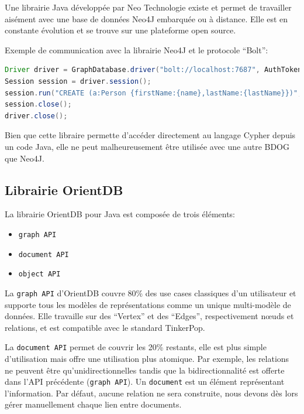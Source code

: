 \documentclass[a4paper,fleqn,12pt,oneside]{report}
\begin{document}
Une librairie Java développée par Neo Technologie existe et permet de travailler aisément avec une base de données Neo4J embarquée ou à distance. Elle est en constante évolution et se trouve sur une plateforme open source. 

Exemple de communication avec la librairie Neo4J et le protocole \enquote{Bolt}:
\vspace{0.6cm}
\begin{lstlisting}[language=java]
Driver driver = GraphDatabase.driver("bolt://localhost:7687", AuthTokens.basic("matrix", "neo"));
Session session = driver.session();
session.run("CREATE (a:Person {firstName:{name},lastName:{lastName}})", parameters("firstName","Gilles","lastName","Bodart"));
session.close();
driver.close();

\end{lstlisting}

Bien que cette libraire permette d'accéder directement au langage Cypher depuis un code Java, elle ne peut malheureusement être utilisée avec une autre BDOG que Neo4J. 

\subsection{Librairie OrientDB}

La librairie OrientDB pour Java est composée de trois éléments:

\begin{itemize}
\item[•] \texttt{graph API}
\item[•] \texttt{document API}
\item[•] \texttt{object API}
\end{itemize}

La \texttt{graph API} d'OrientDB couvre 80\% des use cases classiques d'un utilisateur et supporte tous les modèles de représentations comme un unique multi-modèle de données. Elle travaille sur des \enquote{Vertex} et des \enquote{Edges}, respectivement nœuds et relations, et est compatible avec le standard TinkerPop.

La \texttt{document API} permet de couvrir les 20\% restants, elle est plus simple d'utilisation mais offre une utilisation plus atomique. Par exemple, les relations ne peuvent être qu'unidirectionnelles tandis que la bidirectionnalité est offerte dans l'API précédente (\texttt{graph API}). Un \texttt{document} est un élément représentant l'information. Par défaut, aucune relation ne sera construite, nous devons dès lors gérer manuellement chaque lien entre documents.
\end{document}
